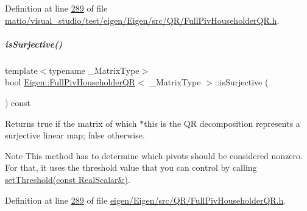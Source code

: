 Definition at line \hyperlink{matio_2visual__studio_2test_2eigen_2_eigen_2src_2_q_r_2_full_piv_householder_q_r_8h_source_l00289}{289} of file \hyperlink{matio_2visual__studio_2test_2eigen_2_eigen_2src_2_q_r_2_full_piv_householder_q_r_8h_source}{matio/visual\+\_\+studio/test/eigen/\+Eigen/src/\+Q\+R/\+Full\+Piv\+Householder\+Q\+R.\+h}.

\mbox{\label{group___q_r___module_aa3593db4708ce9079b0bdf219b99f57e}} 
\subparagraph{\texorpdfstring{is\+Surjective()}{isSurjective()}\hspace{0.1cm}{\footnotesize\ttfamily [2/2]}}
{\footnotesize\ttfamily template$<$typename \+\_\+\+Matrix\+Type$>$ \\
bool \hyperlink{group___q_r___module_class_eigen_1_1_full_piv_householder_q_r}{Eigen\+::\+Full\+Piv\+Householder\+QR}$<$ \+\_\+\+Matrix\+Type $>$\+::is\+Surjective (\begin{DoxyParamCaption}{ }\end{DoxyParamCaption}) const\hspace{0.3cm}{\ttfamily [inline]}}

\begin{DoxyReturn}{Returns}
true if the matrix of which $\ast$this is the QR decomposition represents a surjective linear map; false otherwise.
\end{DoxyReturn}
\begin{DoxyNote}{Note}
This method has to determine which pivots should be considered nonzero. For that, it uses the threshold value that you can control by calling \hyperlink{group___q_r___module_a92277e572bf98245891015d12dd2b602}{set\+Threshold(const Real\+Scalar\&)}. 
\end{DoxyNote}


Definition at line \hyperlink{eigen_2_eigen_2src_2_q_r_2_full_piv_householder_q_r_8h_source_l00289}{289} of file \hyperlink{eigen_2_eigen_2src_2_q_r_2_full_piv_householder_q_r_8h_source}{eigen/\+Eigen/src/\+Q\+R/\+Full\+Piv\+Householder\+Q\+R.\+h}.

